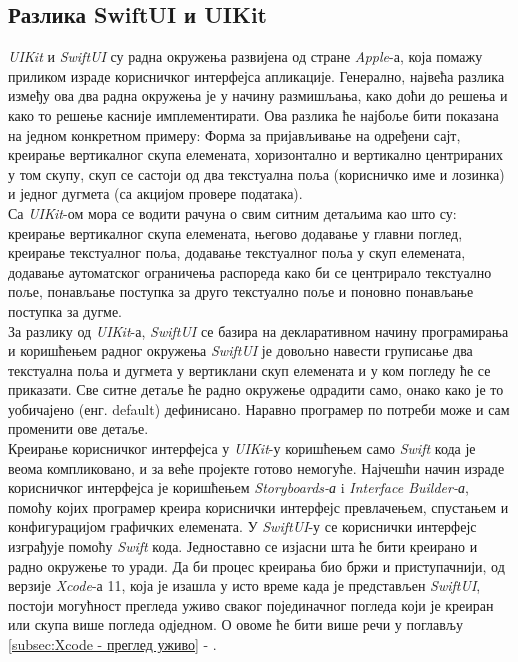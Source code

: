 \documentclass[12pt,oneside]{memoir}
\begin{document}
\subsection{Разлика SwiftUI и UIKit}
\label{subsec:Разлика SwiftUI и UIKit}

\indent \textit{UIKit} и \textit{SwiftUI} су радна окружења развијена од стране \textit{Apple}-а, која помажу приликом израде корисничког интерфејса апликације. Генерално, највећа разлика између ова два радна окружења је у начину размишљања, како доћи до решења и како то решење касније имплементирати. Ова разлика ће најбоље бити показана на једном конкретном примеру: Форма за пријављивање на одређени сајт, креирање вертикалног скупа елемената, хоризонтално и вертикално центрираних у том скупу, скуп се састоји од два текстуална поља (корисничко име и лозинка) и једног дугмета (са акцијом провере података).
\\
\indent Са \textit{UIKit}-ом мора се водити рачуна о свим ситним детаљима као што су: креирање вертикалног скупа елемената, његово додавање у главни поглед, креирање текстуалног поља, додавање текстуалног поља у скуп елемената, додавање аутоматског ограничења распореда како би се центрирало текстуално поље, понављање поступка за друго текстуално поље и поновно понављање поступка за дугме. 
\\
\indent За разлику од \textit{UIKit}-а, \textit{SwiftUI} се базира на декларативном начину програмирања и коришћењем радног окружења \textit{SwiftUI} је довољно навести груписање два текстуална поља и дугмета у вертиклани скуп елемената и у ком погледу ће се приказати. Све ситне детаље ће радно окружење одрадити само, онако како је то уобичајено (енг. default) дефинисано. Наравно програмер по потреби може и сам променити ове детаље.
\\
\indent Креирање корисничког интерфејса у \textit{UIKit}-у коришћењем само \textit{Swift} кода је веома компликовано, и за веће пројекте готово немогуће. Најчешћи начин израде корисничког интерфејса је коришћењем \textit{Storyboards-а} i \textit{Interface Builder-а}, помоћу којих програмер креира кориснички интерфејс превлачењем, спустањем и конфигурацијом графичких елемената. У \textit{SwiftUI}-у се кориснички интерфејс изграђује помоћу \textit{Swift} кода. Једноставно се изјасни шта ће бити креирано и радно окружење то уради. Да би процес креирања био бржи и приступачнији, од верзије \textit{Xcode}-а 11, која је изашла у исто време када је представљен \textit{SwiftUI}, постоји могућност прегледа уживо сваког појединачног погледа који је креиран или скупа више погледа одједном. О овоме ће бити више речи у поглављу \ref{subsec:Xcode - преглед уживо} - .
\end{document}
